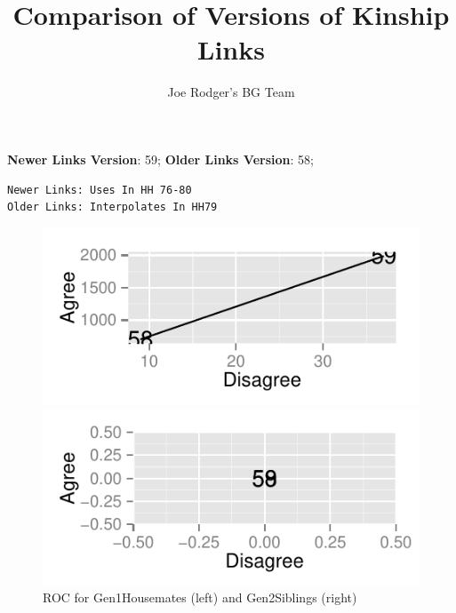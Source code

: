 \documentclass[a4paper]{article}\usepackage{graphicx, color}
\title{Comparison of Versions of Kinship Links}
\author{Joe Rodger's BG Team}
\makeatletter
\def\maxwidth{ %
  \ifdim\Gin@nat@width>\linewidth
    \linewidth
  \else
    \Gin@nat@width
  \fi
}
\newenvironment{kframe}{%
 \def\at@end@of@kframe{}%
 \ifinner\ifhmode%
  \def\at@end@of@kframe{\end{minipage}}%
  \begin{minipage}{\columnwidth}%
 \fi\fi%
 \def\FrameCommand##1{\hskip\@totalleftmargin \hskip-\fboxsep
 \colorbox{shadecolor}{##1}\hskip-\fboxsep
     \hskip-\linewidth \hskip-\@totalleftmargin \hskip\columnwidth}%
 \MakeFramed {\advance\hsize-\width
   \@totalleftmargin\z@ \linewidth\hsize
   \@setminipage}}%
 {\par\unskip\endMakeFramed%
 \at@end@of@kframe}
\newenvironment{knitrout}{}{} %
\makeatother
\begin{document}
\maketitle

\setlength{\parindent}{0pt}%







\textbf{Newer Links Version}: 59;
\textbf{Older Links Version}: 58;

\begin{knitrout}
\color{fgcolor}\begin{kframe}
\begin{verbatim}
Newer Links: Uses In HH 76-80
Older Links: Interpolates In HH79
\end{verbatim}
\end{kframe}
\end{knitrout}


\begin{figure}[htbp]
\begin{knitrout}
\color{fgcolor}
\includegraphics[width=\maxwidth]{figure/unnamed-chunk-31} 

\includegraphics[width=\maxwidth]{figure/unnamed-chunk-32} 

\end{knitrout}

\caption{ROC for Gen1Housemates (left) and Gen2Siblings (right)}
\end{figure}
\end{document}
